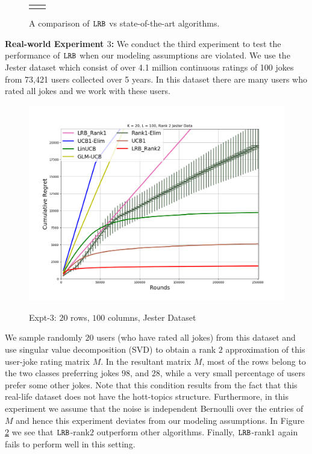 \begin{figure}[!th]
\begin{tabular}{cc}
{  		\label{fig:4}
    }
    \end{tabular}
    \caption{A comparison of ${\tt LRB}$ vs state-of-the-art algorithms. }
    \label{fig:karmed1}
    \vspace*{-1.1em}
\end{figure}
\textbf{Real-world Experiment $3$:} We conduct the third experiment to test the performance of ${\tt LRB}$ when our modeling assumptions are violated. We use the Jester dataset \citep{goldberg2001eigentaste} which consist of over 4.1 million continuous ratings of 100 jokes from 73,421 users collected over 5 years. In this dataset there are many users who rated all jokes and we work with these users. 
\begin{figure}
    {
    		\includegraphics[scale=0.13]{img/Figure_L4.png}
   }
 \caption{Expt-$3$: $20$ rows, $100$ columns, Jester Dataset}
 \label{fig:6}
 \vspace{-1.0em}
\end{figure}
We sample randomly $20$ users (who have rated all jokes) from this dataset and use singular value decomposition (SVD) to obtain a rank $2$ approximation of this user-joke rating matrix $M$. In the resultant matrix $M$, most of the rows belong to the two classes preferring jokes $98$, and $28$, while a very small percentage of users prefer some other jokes. Note that this condition results from the fact that this real-life dataset does not have the hott-topics structure. Furthermore, in this experiment we assume that the noise is independent Bernoulli over the entries of $M$ and hence this experiment deviates from our modeling assumptions. In Figure \ref{fig:6} we see that ${\tt LRB}$-rank$2$ outperform other algorithms. Finally, ${\tt LRB}$-rank$1$ again fails to perform well in this setting.
